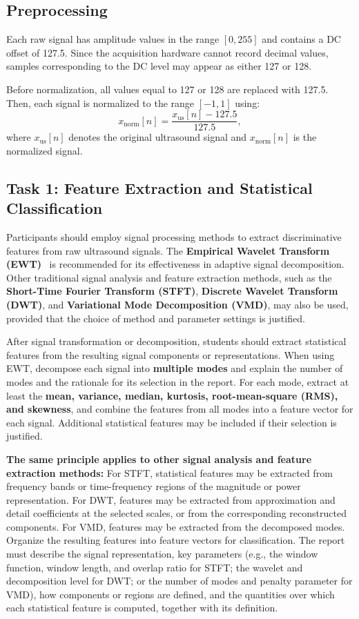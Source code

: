 \documentclass[11pt]{article}
\begin{document}
\subsection{Preprocessing}

Each raw signal has amplitude values in the range $[0,255]$ and contains a DC offset of 127.5. Since the acquisition hardware cannot record decimal values, samples corresponding to the DC level may appear as either 127 or 128.

Before normalization, all values equal to 127 or 128 are replaced with 127.5. Then, each signal is normalized to the range $[-1,1]$ using:
\begin{equation}
    x_{\mathrm{norm}}[n]=\frac{x_{\mathrm{us}}[n]-127.5}{127.5},
\end{equation}
where $x_{\mathrm{us}}[n]$ denotes the original ultrasound signal and $x_{\mathrm{norm}}[n]$ is the normalized signal.

\subsection{Task 1: Feature Extraction and Statistical Classification}

Participants should employ signal processing methods to extract discriminative features from raw ultrasound signals. The \textbf{Empirical Wavelet Transform (EWT)}~\cite{gilles2013ewt} is recommended for its effectiveness in adaptive signal decomposition. Other traditional signal analysis and feature extraction methods, such as the \textbf{Short-Time Fourier Transform (STFT)}, \textbf{Discrete Wavelet Transform (DWT)}, and \textbf{Variational Mode Decomposition (VMD)}, may also be used, provided that the choice of method and parameter settings is justified.

After signal transformation or decomposition, students should extract statistical features from the resulting signal components or representations. When using EWT, decompose each signal into \textbf{multiple modes} and explain the number of modes and the rationale for its selection in the report. For each mode, extract at least the \textbf{mean, variance, median, kurtosis, root-mean-square (RMS), and skewness}, and combine the features from all modes into a feature vector for each signal. Additional statistical features may be included if their selection is justified.

\textbf{The same principle applies to other signal analysis and feature extraction methods:} For STFT, statistical features may be extracted from frequency bands or time-frequency regions of the magnitude or power representation. For DWT, features may be extracted from approximation and detail coefficients at the selected scales, or from the corresponding reconstructed components. For VMD, features may be extracted from the decomposed modes. Organize the resulting features into feature vectors for classification. The report must describe the signal representation, key parameters (e.g., the window function, window length, and overlap ratio for STFT; the wavelet and decomposition level for DWT; or the number of modes and penalty parameter for VMD), how components or regions are defined, and the quantities over which each statistical feature is computed, together with its definition.
\end{document}
